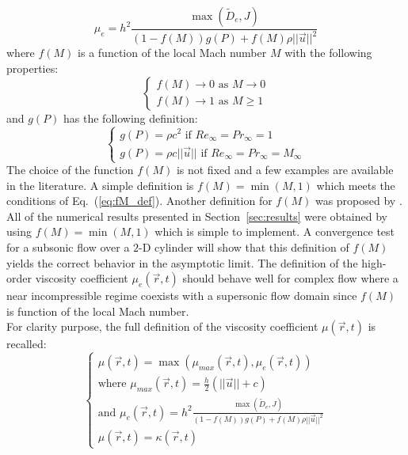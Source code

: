 \documentclass[preprint,10pt]{elsarticle}
\newcommand{\eqt}[1]{Eq.~(\ref{#1})}                     %
\newcommand{\sct}[1]{Section~\ref{#1}}                   %
\begin{document}
\begin{equation}
\mu_e = h^2 \frac{\max (\tilde{D}_e, J)}{(1-f(M) ) g(P) + f(M) \rho || \vec{u} ||^2}
\end{equation} 
where $f(M)$ is a function of the local Mach number $M$ with the following properties:
\begin{equation}
\label{eq:fM_def}
\left\{
\begin{array}{l}
f(M) \to 0 \text{ as } M \to 0 \\
f(M) \to 1 \text{ as } M \geq 1 
\end{array}
\right.
\end{equation} 
and $g(P)$ has the following definition:
\begin{equation}
\label{eq:gP_def}
\left\{
\begin{array}{l}
g(P) = \rho c^2 \text{ if } Re_{\infty} = Pr_{\infty} = 1 \\
g(P) = \rho c || \vec{u} || \text{ if } Re_{\infty} = Pr_{\infty} = M_{\infty} 
\end{array}
\right.
\end{equation} 
The choice of the function $f(M)$ is not fixed and a few examples are available in the literature. A simple definition is $f(M) = \min (M,1)$ which meets the conditions of \eqt{eq:fM_def}. Another definition for $f(M)$ was proposed by \cite{Roe}.
All of the numerical results presented in \sct{sec:results} were obtained by using $f(M) = \min (M,1)$ which is simple to implement. A convergence test for a subsonic flow over a $2$-D cylinder will show that this definition of $f(M)$ yields the correct behavior in the asymptotic limit.
The definition of the high-order viscosity coefficient $\mu_e(\vec{r},t)$ should behave well for complex flow where a near incompressible regime coexists with a supersonic flow domain since $f(M)$ is function of the local Mach number. \\
For clarity purpose, the full definition of the viscosity coefficient $\mu(\vec{r},t)$ is recalled:
\begin{equation}
\label{eq:final_def_visc_coeff}
\left\{
\begin{array}{l}
\mu(\vec{r},t) = \max (\mu_{max}(\vec{r},t), \mu_e (\vec{r},t)) \\
\text{where } \mu_{max}(\vec{r},t) = \frac{h}{2} (||\vec{u}|| + c) \\
\text{and } \mu_e(\vec{r},t) = h^2 \frac{\max (\tilde{D}_e, J)}{(1-f(M) ) g(P) + f(M) \rho || \vec{u} ||^2} \\
\mu(\vec{r},t) = \kappa(\vec{r},t)
\end{array}
\right.
\end{equation}
\end{document}
